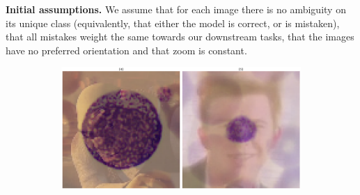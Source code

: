 \documentclass[11pt]{template}
\begin{document}
\begin{multicols}{2}
\textbf{Initial assumptions.}
We assume that for each image there is no ambiguity on its unique class (equivalently, that either the model is correct, or is mistaken), that all mistakes weight the same towards our downstream tasks, that the images have no preferred orientation and that zoom is constant. 
\begin{figure}[H]
        \begin{subfigure}{\linewidth}
            \centering
            \includegraphics[width=\linewidth]{assets/outliers.png}

\end{subfigure}
\end{figure}
\end{multicols}
\end{document}
